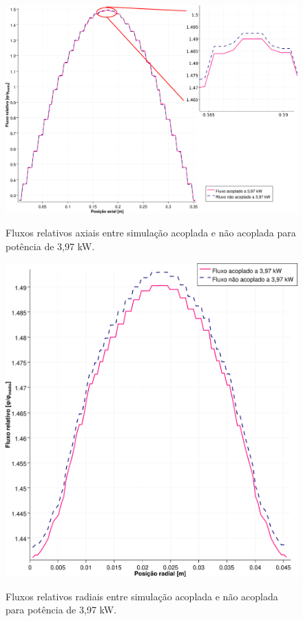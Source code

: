 \begin{figure}[htb]
  \caption{Fluxos relativos axiais entre simulação acoplada e não acoplada para
    potência de 3,97 kW.}
  \centering\includegraphics[scale=0.5]{figuras/Flux_rel_z_100_port_trabalhado.png}
  \label{fig:flux_z_100}
\end{figure}

\begin{figure}[htb]
  \caption{Fluxos relativos radiais entre simulação acoplada e não acoplada para
    potência de 3,97 kW.}
  \centering\includegraphics[scale=0.5]{figuras/Flux_rel_x_100_port.png}
  \label{fig:flux_x_100}
\end{figure}

